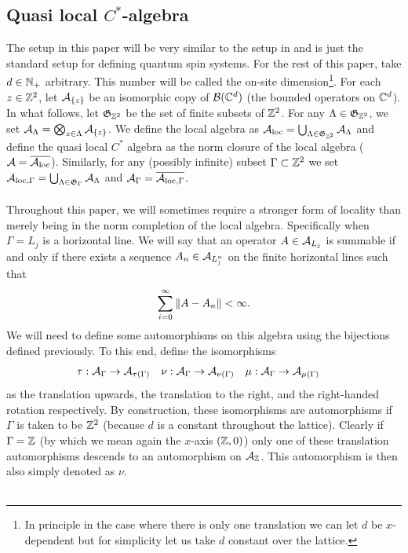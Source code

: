 \documentclass[11pt,a4paper,twoside]{article}
\numberwithin{equation}{section}
\begin{document}
	\subsection{Quasi local $C^*$-algebra}\label{sec:QuasiLocalC*Algebra}
	The setup in this paper will be very similar to the setup in \cite{ogata2021h3gmathbb} and is just the standard setup for defining quantum spin systems. For the rest of this paper, take $d\in\NN_+$ arbitrary. This number will be called the on-site dimension\footnote{In principle in the case where there is only one translation we can let $d$ be $x$-dependent but for simplicity let us take $d$ constant over the lattice.}. For each $z\in\ZZ^2$, let $\AA_{\{z\}}$ be an isomorphic copy of $\BB(\CC^d)$ (the bounded operators on $\CC^d$). In what follows, let $\mathfrak{G}_{\ZZ^2}$ be the set of finite subsets of $\ZZ^2$. For any $\Lambda\in\mathfrak{G}_{\ZZ^2}$, we set $\AA_\Lambda=\bigotimes_{z\in\Lambda}\AA_{\{z\}}$. We define the local algebra as $\AA_{\text{loc}}=\bigcup_{\Lambda\in \mathfrak{G}_{\ZZ^2}}\AA_{\Lambda}$ and define the quasi local $C^*$ algebra as the norm closure of the local algebra ($\AA=\overline{\AA_{\text{loc}}}$). Similarly, for any (possibly infinite) subset $\Gamma\subset\ZZ^2$ we set $\AA_{\text{loc},\Gamma}=\bigcup_{\Lambda\in \mathfrak{G}_{\Gamma}}\AA_{\Lambda}$ and $\AA_\Gamma=\overline{\AA_{\text{loc},\Gamma}}$.\\\\
	Throughout this paper, we will sometimes require a stronger form of locality than merely being in the norm completion of the local algebra. Specifically when $\Gamma=L_j$ is a horizontal line. We will say that an operator $A\in\AA_{L_j}$ is summable if and only if there exists a sequence $A_n\in\AA_{L_{j}^n}$ on the finite horizontal lines such that
	\begin{equation}
		\sum_{i=0}^{\infty}\norm{A-A_n}<\infty.
	\end{equation}
	We will need to define some automorphisms on this algebra using the bijections defined previously. To this end, define the isomorphisms
	\begin{align}
		\tau&:\AA_\Gamma\rightarrow\AA_{\tau(\Gamma)}&\nu&:\AA_\Gamma\rightarrow\AA_{\nu(\Gamma)}&\mu&:\AA_\Gamma\rightarrow\AA_{\mu(\Gamma)}
	\end{align}
	as the translation upwards, the translation to the right, and the right-handed rotation respectively. By construction, these isomorphisms are automorphisms if $\Gamma$ is taken to be $\ZZ^2$ (because $d$ is a constant throughout the lattice). Clearly if $\Gamma=\ZZ$ (by which we mean again the $x$-axis $(\ZZ,0)$) only one of these translation automorphisms descends to an automorphism on $\AA_{\ZZ}$. This automorphism is then also simply denoted as $\nu$.\\\\
\end{document}
